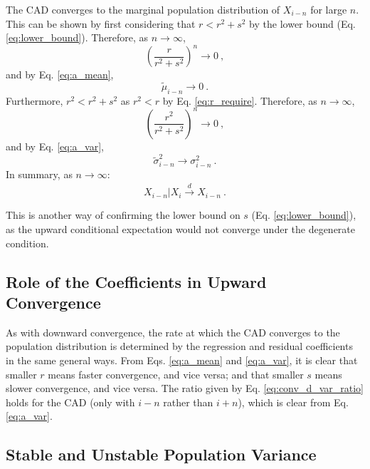 \documentclass{svproc} %
\begin{document}
The CAD converges to the marginal population distribution of $X_{i-n}$ for large $n$. This can be shown by first considering that $r < r^2 + s^2$ by the lower bound (Eq. \ref{eq:lower_bound}). Therefore, as $n \rightarrow \infty$,
\begin{equation}
(\frac{r}{r^2+s^2})^n \rightarrow 0 \ ,
\label{eq:conv_up_one}
\end{equation}
and by Eq. \ref{eq:a_mean}, 
\begin{equation}
\tilde{\mu}_{i-n} \rightarrow 0 \ .
\label{eq:conv_a_mean}
\end{equation}
%
Furthermore, $r^2 < r^2 + s^2$ as $r^2 < r$ by Eq. \ref{eq:r_require}. Therefore, as $n \rightarrow \infty$,
\begin{equation}
(\frac{r^2}{r^2+s^2})^n \rightarrow 0 \ ,
\label{eq:conv_up_two}
\end{equation}
and by Eq. \ref{eq:a_var}, 
\begin{equation}
\tilde{\sigma}_{i-n}^2 \rightarrow \sigma_{i-n}^2 \ .
\label{eq:conv_a_var}
\end{equation}
%
In summary, as $n \rightarrow \infty$:
\begin{equation}
X_{i-n}|X_i \xrightarrow{\overset{}{d}} X_{i-n} \ .
\label{eq:conv_a}
\end{equation}

This is another way of confirming the lower bound on $s$ (Eq. \ref{eq:lower_bound}), as the upward conditional expectation would not converge under the degenerate condition.


\subsection{Role of the Coefficients in Upward Convergence} \label{role_up}
As with downward convergence, the rate at which the CAD converges to the population distribution is determined by the regression and residual coefficients in the same general ways. From Eqs. \ref{eq:a_mean} and \ref{eq:a_var}, it is clear that smaller $r$ means faster convergence, and vice versa; and that smaller $s$ means slower convergence, and vice versa. The ratio given by Eq. \ref{eq:conv_d_var_ratio} holds for the CAD (only with $i-n$ rather than $i+n$), which is clear from Eq. \ref{eq:a_var}. 


\subsection{Stable and Unstable Population Variance} \label{pvd}
\end{document}
